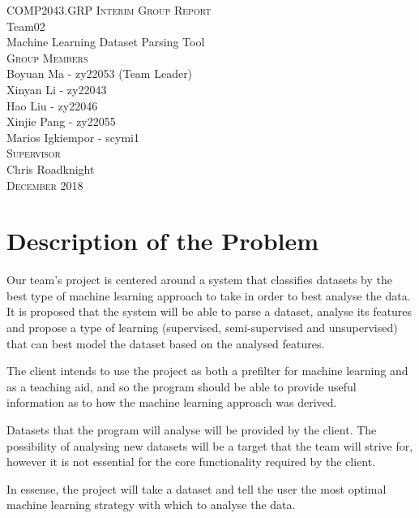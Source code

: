 \documentclass[titlepage]{article}
\author{Boyuan Ma \and Xinyan Li \and Hao Liu \and Xinjie Pang \and Marios Igkiempor}
\begin{document}
\begin{titlepage}
  \centering
  \large{\textsc{COMP2043.GRP Interim Group Report}}\\
  \vspace{3cm}
  \huge{Team02}\\
  \Huge{Machine Learning Dataset Parsing Tool}\\
  \vspace{3cm}
  \LARGE{\textsc{Group Members}}\\
  \Large{Boyuan Ma - zy22053 (Team Leader)}\\
  \Large{Xinyan Li - zy22043}\\
  \Large{Hao Liu - zy22046}\\
  \Large{Xinjie Pang - zy22055}\\
  \Large{Marios Igkiempor - scymi1}\\
  \vspace{1cm}
  \LARGE{\textsc{Supervisor}}\\
  \Large{Chris Roadknight}\\
  \vfill
  \large{\textsc{December 2018}}
  
\end{titlepage}

\tableofcontents
\pagebreak

\section{Description of the Problem}
Our team's project is centered around a system that classifies datasets by the best type of machine learning approach to take in order to best analyse the data. It is proposed that the system will be able to parse a dataset, analyse its features and propose a type of learning (supervised, semi-supervised and unsupervised) that can best model the dataset based on the analysed features.

The client intends to use the project as both a prefilter for machine learning and as a teaching aid, and so the program should be able to provide useful information as to how the machine learning approach was derived.

Datasets that the program will analyse will be provided by the client. The possibility of analysing new datasets will be a target that the team will strive for, however it is not essential for the core functionality required by the client.

In essense, the project will take a dataset and tell the user the most optimal machine learning strategy with which to analyse the data.
\end{document}
